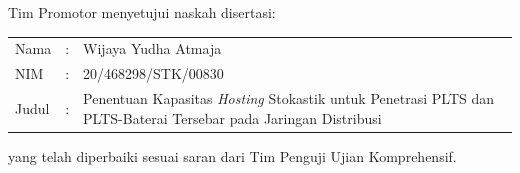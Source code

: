 {}
\vspace*{8pt}
\BgThispage
\noindent Tim Promotor menyetujui naskah disertasi:
\vspace*{-8pt}
{
\begin{longtable}{llp{330pt}}
\hspace*{-14pt} Nama	&:& Wijaya Yudha Atmaja\\
\hspace*{-14pt} NIM		&:& 20/468298/STK/00830\\
\hspace*{-14pt} Judul	&:& Penentuan Kapasitas \textit{Hosting} Stokastik untuk Penetrasi PLTS dan PLTS-Baterai Tersebar pada Jaringan Distribusi
\end{longtable}
}
\vspace*{-22pt}
\noindent yang telah diperbaiki sesuai saran dari Tim Penguji Ujian Komprehensif.
\vspace*{4cm}

